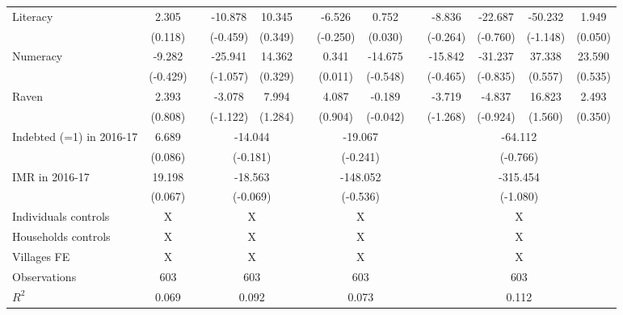\begin{table}[htbp]
{\begin{tabular}{lcccccccccccc}
    Literacy & 2.305 &       & -10.878 & 10.345 &       & -6.526 & 0.752 &       & -8.836 & -22.687 & -50.232 & 1.949 \\
          & (0.118) &       & (-0.459) & (0.349) &       & (-0.250) & (0.030) &       & (-0.264) & (-0.760) & (-1.148) & (0.050) \\
    Numeracy & -9.282 &       & -25.941 & 14.362 &       & 0.341 & -14.675 &       & -15.842 & -31.237 & 37.338 & 23.590 \\
          & (-0.429) &       & (-1.057) & (0.329) &       & (0.011) & (-0.548) &       & (-0.465) & (-0.835) & (0.557) & (0.535) \\
    Raven & 2.393 &       & -3.078 & 7.994 &       & 4.087 & -0.189 &       & -3.719 & -4.837 & 16.823 & 2.493 \\
          & (0.808) &       & (-1.122) & (1.284) &       & (0.904) & (-0.042) &       & (-1.268) & (-0.924) & (1.560) & (0.350) \\
\cmidrule{1-2}\cmidrule{4-5}\cmidrule{7-8}\cmidrule{10-13}    Indebted (=1) in 2016-17 & 6.689 &       & \multicolumn{2}{c}{-14.044} &       & \multicolumn{2}{c}{-19.067} &       & \multicolumn{4}{c}{-64.112} \\
          & (0.086) &       & \multicolumn{2}{c}{(-0.181)} &       & \multicolumn{2}{c}{(-0.241)} &       & \multicolumn{4}{c}{(-0.766)} \\
    IMR in 2016-17 & 19.198 &       & \multicolumn{2}{c}{-18.563} &       & \multicolumn{2}{c}{-148.052} &       & \multicolumn{4}{c}{-315.454} \\
          & (0.067) &       & \multicolumn{2}{c}{(-0.069)} &       & \multicolumn{2}{c}{(-0.536)} &       & \multicolumn{4}{c}{(-1.080)} \\
    Individuals controls & X     &       & \multicolumn{2}{c}{X} &       & \multicolumn{2}{c}{X} &       & \multicolumn{4}{c}{X} \\
    Households controls & X     &       & \multicolumn{2}{c}{X} &       & \multicolumn{2}{c}{X} &       & \multicolumn{4}{c}{X} \\
    Villages FE & X     &       & \multicolumn{2}{c}{X} &       & \multicolumn{2}{c}{X} &       & \multicolumn{4}{c}{X} \\
    \midrule
    Observations & 603   &       & \multicolumn{2}{c}{603} &       & \multicolumn{2}{c}{603} &       & \multicolumn{4}{c}{603} \\
    $R^2$ & 0.069 &       & \multicolumn{2}{c}{0.092} &       & \multicolumn{2}{c}{0.073} &       & \multicolumn{4}{c}{0.112} \\

\end{tabular}}
\end{table}
